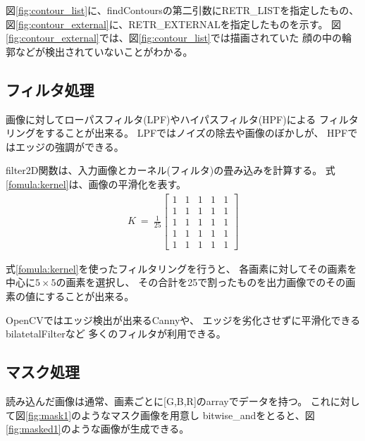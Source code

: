 \documentclass[dvipdfmx]{jsarticle}
\begin{document}
図\ref{fig:contour_list}に、findContoursの第二引数にRETR\_LISTを指定したもの、
図\ref{fig:contour_external}に、RETR\_EXTERNALを指定したものを示す。
図\ref{fig:contour_external}では、図\ref{fig:contour_list}では描画されていた
顔の中の輪郭などが検出されていないことがわかる。


\subsection{フィルタ処理}

画像に対してローパスフィルタ(LPF)やハイパスフィルタ(HPF)による
フィルタリングをすることが出来る。
LPFではノイズの除去や画像のぼかしが、
HPFではエッジの強調ができる。

filter2D関数は、入力画像とカーネル(フィルタ)の畳み込みを計算する。
式\ref{fomula:kernel}は、画像の平滑化を表す。
\begin{eqnarray}
  K ~=~ \frac{1}{25}
  \left[
    \begin{array}{rrrrr}
      1 & 1 & 1 & 1 & 1 \\
      1 & 1 & 1 & 1 & 1 \\
      1 & 1 & 1 & 1 & 1 \\
      1 & 1 & 1 & 1 & 1 \\
      1 & 1 & 1 & 1 & 1
    \end{array}
    \right]
  \label{fomula:kernel}
\end{eqnarray}

式\ref{fomula:kernel}を使ったフィルタリングを行うと、
各画素に対してその画素を中心に$5\times5$の画素を選択し、
その合計を25で割ったものを出力画像でのその画素の値にすることが出来る。

OpenCVではエッジ検出が出来るCannyや、
エッジを劣化させずに平滑化できるbilatetalFilterなど
多くのフィルタが利用できる。


\subsection{マスク処理}

読み込んだ画像は通常、画素ごとに[G,B,R]のarrayでデータを持つ。
これに対して図\ref{fig:mask1}のようなマスク画像を用意し
bitwise\_andをとると、図\ref{fig:masked1}のような画像が生成できる。
\end{document}
